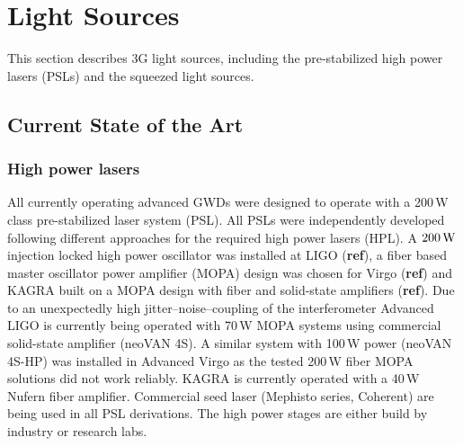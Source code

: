 
\chapter{Light Sources}
\label{sec:Light_sources}

This section describes 3G light sources, including the pre-stabilized high power lasers (PSLs) and the squeezed light sources. 

\section{Current State of the Art}
\subsection{High power lasers}
All currently operating advanced GWDs were designed to operate with a 200\,W class pre-stabilized laser system (PSL). All PSLs were independently developed following different approaches for the required high power lasers (HPL). A $ 200\,{\rm W} $ injection locked high power oscillator was installed at LIGO (\textbf{ref}), a fiber based master oscillator power amplifier (MOPA) design was chosen for Virgo (\textbf{ref}) and KAGRA built on a MOPA design with fiber and solid-state amplifiers (\textbf{ref}). Due to an unexpectedly high jitter--noise--coupling of the interferometer Advanced LIGO is currently being operated with 70\,W MOPA systems using commercial solid-state amplifier (neoVAN 4S). A similar system with 100\,W power (neoVAN 4S-HP) was installed in Advanced Virgo as the tested 200\,W fiber MOPA solutions did not work reliably. KAGRA is currently operated with a 40\,W Nufern fiber amplifier. Commercial seed laser (Mephisto series, Coherent) are being used in all PSL derivations. The high power stages are either build by industry or research labs. 

